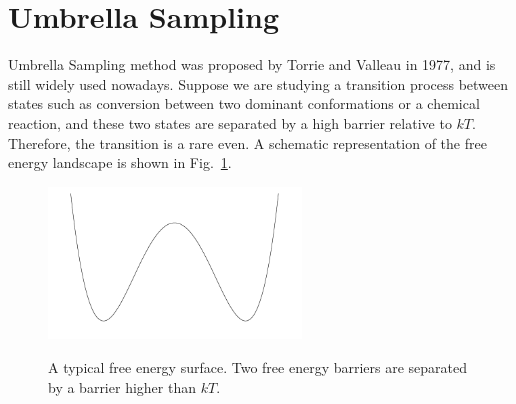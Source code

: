 \section{Umbrella Sampling\label{Sec:ES:US}}
Umbrella Sampling method was proposed by Torrie and Valleau in 1977,\cite{TorrieJComputP1977} and is still widely used nowadays.
Suppose we are studying a transition process between states such as conversion between two dominant conformations or a chemical reaction, and these two states are separated by a high barrier relative to $kT$. Therefore, the transition is a rare even. A schematic representation of the free energy landscape is shown in Fig.~\ref{Fig:ES:dual_harmonic}.
\begin{figure}[htbp]
	\centering
	\includegraphics[width=0.6\textwidth]{figures/dual_harmonic.pdf}\\
	\caption{A typical free energy surface. Two free energy barriers are separated by a barrier higher than $kT$.}\label{Fig:ES:dual_harmonic}
\end{figure}

